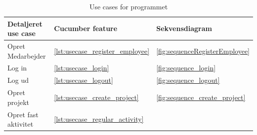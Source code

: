 \begin{table}[H]
    \centering
    \caption{Use cases for programmet}\label{tbl:oversigt}
    \begin{tabular}{lll}
        Detaljeret use case                                  & Cucumber feature                                                                                                                             & Sekvensdiagram                                                                                                                                                  \\
        \midrule
        Opret Medarbejder                                    & \cref{lst:usecase_register_employee}                                                                                                         & \cref{fig:sequenceRegisterEmployee}                                                                                                                             \\
        Log in                                               & \cref{lst:usecase_login}                                                                                                                     & \cref{fig:sequence_login}                                                                                                                                       \\
        Log ud                                               & \cref{lst:usecase_logout}                                                                                                                    & \cref{fig:sequence_logout}                                                                                                                                      \\
        Opret projekt                                        & \cref{lst:usecase_create_project}                                                                                                            & \cref{fig:sequence_create_project}                                                                                                                              \\
        Opret fast aktivitet                                 & \cref{lst:usecase_regular_activity}                                                                                                          &                                                                                                                                                                 \\

\end{tabular}
\end{table}
